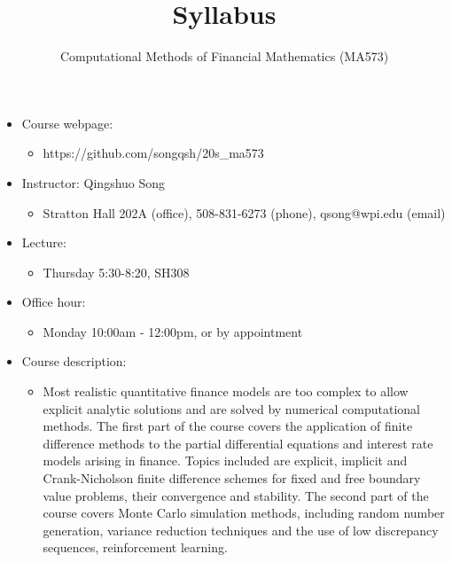\documentclass[11pt]{amsart}
\title{Syllabus}
\author{Computational Methods of Financial Mathematics (MA573)}
\begin{document}
\maketitle

\begin{itemize}
 
 \item Course webpage: 
\begin{itemize}
 \item  https://github.com/songqsh/20s\_ma573
\end{itemize}

 \item Instructor: Qingshuo Song 
\begin{itemize}
 \item  Stratton Hall 202A (office),  508-831-6273 (phone), qsong@wpi.edu (email)
\end{itemize}
\item Lecture:
\begin{itemize}
 \item Thursday 5:30-8:20,  SH308
\end{itemize}

 \item Office hour: 
\begin{itemize}
 \item Monday 10:00am - 12:00pm, or by appointment
\end{itemize}

\item Course description:
\begin{itemize}
 \item Most realistic quantitative finance models are too complex to allow explicit analytic solutions and are solved by numerical computational methods. The first part of the course covers the application of finite difference methods to the partial differential equations and interest rate models arising in finance. Topics included are explicit, implicit and Crank-Nicholson finite difference schemes for fixed and free boundary value problems, their convergence and stability. The second part of the course covers Monte Carlo simulation methods, including random number generation, variance reduction techniques and the use of low discrepancy sequences, reinforcement learning. 
\end{itemize}


\end{itemize}
\end{document}

